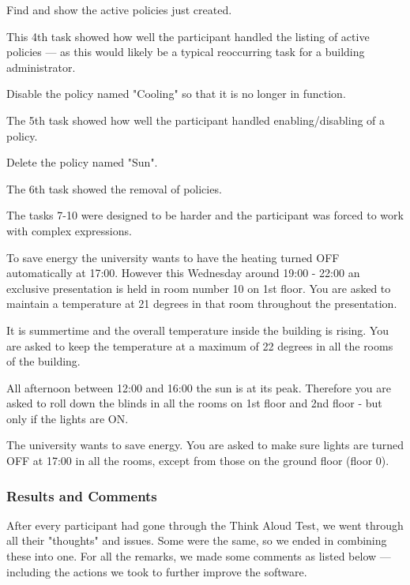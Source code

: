 \begin{framed}
Find and show the active policies just created.
\end{framed}
This 4th task showed how well the participant handled the listing of active policies --- as this would likely be a typical reoccurring task for a building administrator.

\begin{framed}
Disable the policy named "Cooling" so that it is no longer in function.
\end{framed}
The 5th task showed how well the participant handled enabling/disabling of a policy.

\begin{framed}
Delete the policy named "Sun".
\end{framed}
The 6th task showed the removal of policies.

The tasks 7-10 were designed to be harder and the participant was forced to work with complex expressions.

\begin{framed}
To save energy the university wants to have the heating turned OFF automatically at 17:00. However this Wednesday around 19:00 - 22:00 an exclusive presentation is held in room number 10 on 1st floor.
You are asked to maintain a temperature at 21 degrees in that room throughout the presentation.
\end{framed}

\begin{framed}
It is summertime and the overall temperature inside the building is rising. You are asked to keep the temperature at a maximum of 22 degrees in all the rooms of the building.
\end{framed}

\begin{framed}
All afternoon between 12:00 and 16:00 the sun is at its peak. Therefore you are asked to roll down the blinds in all the rooms on 1st floor and 2nd floor - but only if the lights are ON.
\end{framed}

\begin{framed}
The university wants to save energy. You are asked to make sure lights are turned OFF at 17:00 in all the rooms, except from those on the ground floor (floor 0).
\end{framed}

\subsubsection{Results and Comments}
\label{results-and-comments}
After every participant had gone through the Think Aloud Test, we went through all their "thoughts" and issues. Some were the same, so we ended in combining these into one.
For all the remarks, we made some comments as listed below --- including the actions we took to further improve the software.

